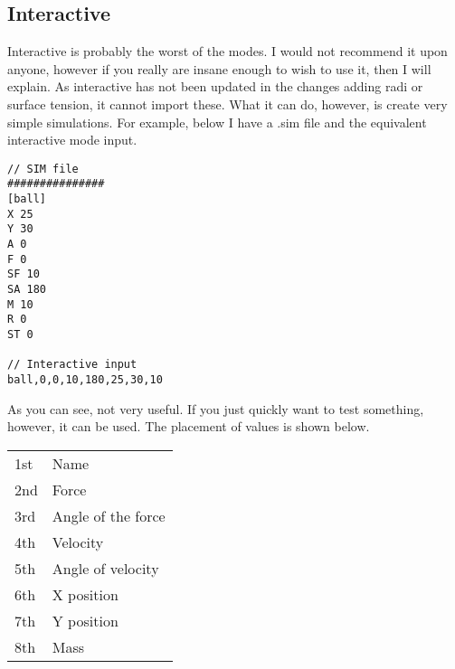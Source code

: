 \documentclass[11pt]{article}
\begin{document}
\subsection {Interactive}
Interactive is probably the worst of the modes.\newline
I would not recommend it upon anyone, however if you really are insane enough to wish to use it, then I will explain. As interactive has not been updated in the changes adding radi or surface tension, it cannot import these. What it can do, however, is create very simple simulations. For example, below I have a .sim file and the equivalent interactive mode input.
\begin{lstlisting}
// SIM file
###############
[ball]
X 25
Y 30
A 0
F 0
SF 10
SA 180
M 10
R 0
ST 0

// Interactive input
ball,0,0,10,180,25,30,10
\end{lstlisting}
As you can see, not very useful. If you just quickly want to test something, however, it can be used. The placement of values is shown below.

\begin{center}
\begin{tabular}{ l l }
	1st & Name \\
	2nd & Force \\
	3rd & Angle of the force \\
	4th & Velocity \\
	5th & Angle of velocity \\
	6th & X position \\
	7th & Y position \\
	8th & Mass \\
\end{tabular}
\end{center}
\end{document}
